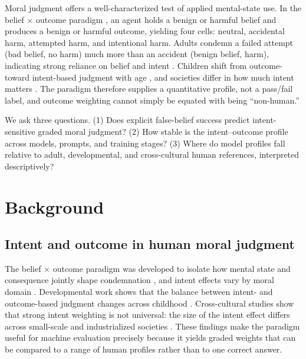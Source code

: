 \documentclass[10pt,letterpaper]{article}
\begin{document}
Moral judgment offers a well-characterized test of applied mental-state use.
In the belief $\times$ outcome paradigm \citep{young2007neural,young2008belief,young2009innocent}, an agent holds a benign or harmful belief and produces a benign or harmful outcome, yielding four cells: neutral, accidental harm, attempted harm, and intentional harm.
Adults condemn a failed attempt (bad belief, no harm) much more than an accident (benign belief, harm), indicating strong reliance on belief and intent \citep{young2007neural}.
Children shift from outcome- toward intent-based judgment with age \citep{cushman2013development}, and societies differ in how much intent matters \citep{barrett2016societies,curtin2020kinship}.
The paradigm therefore supplies a quantitative profile, not a pass/fail label, and outcome weighting cannot simply be equated with being ``non-human.''

We ask three questions.
(1) Does explicit false-belief success predict intent-sensitive graded moral judgment?
(2) How stable is the intent--outcome profile across models, prompts, and training stages?
(3) Where do model profiles fall relative to adult, developmental, and cross-cultural human references, interpreted descriptively?

\section{Background}

\subsection{Intent and outcome in human moral judgment}
The belief $\times$ outcome paradigm was developed to isolate how mental state and consequence jointly shape condemnation \citep{young2007neural,young2008belief,young2009innocent}, and intent effects vary by moral domain \citep{young2011ignorance}.
Developmental work shows that the balance between intent- and outcome-based judgment changes across childhood \citep{cushman2013development}.
Cross-cultural studies show that strong intent weighting is not universal: the size of the intent effect differs across small-scale and industrialized societies \citep{barrett2016societies,curtin2020kinship}.
These findings make the paradigm useful for machine evaluation precisely because it yields graded weights that can be compared to a range of human profiles rather than to one correct answer.
\end{document}
